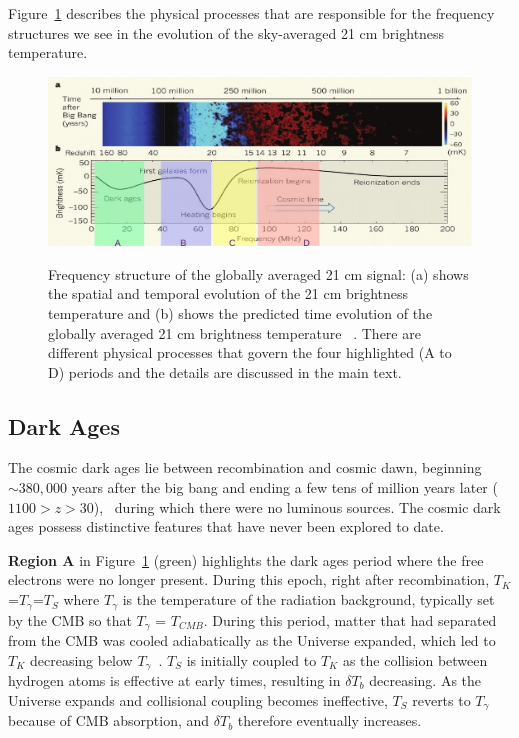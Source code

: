 	Figure~\ref{Fig:epochs} describes the physical processes that are responsible for the frequency structures we see in the evolution of the sky-averaged 21 cm brightness temperature.
	
	\begin{figure}
		\begin{center}
			\includegraphics[width=\linewidth]{Figures/epo.pdf}\\
			\caption{Frequency structure of the globally averaged 21 cm signal: (a) shows the spatial and temporal evolution of the 21 cm brightness temperature and (b) shows the predicted time evolution of the globally averaged 21 cm brightness temperature ~\citep{2012RPPh...75h6901P}. There are different physical processes that govern the four highlighted (A to D) periods and the details are discussed in the main text.}			
			\label{Fig:epochs}
		\end{center}
	\end{figure}
	
	\subsection{Dark Ages}
	
	The cosmic dark ages lie between recombination and cosmic dawn, beginning $\sim380,000$ years after the big bang and ending a few tens of million years later ($1100 > z > 30$),~\citep{2014arXiv1412.2096J} during which there were no luminous sources. The cosmic dark ages possess distinctive features that have never been explored to date. 
	
	\textbf{Region A} in Figure~\ref{Fig:epochs} (green) highlights the dark ages period where the free electrons were no longer present. During this epoch, right after recombination, $T_K$=$T_\gamma$=$T_S$ where $T_\gamma$ is the temperature of the radiation background, typically set by the CMB so that $T_\gamma$ = $T_{CMB}$. During this period, matter that had separated from the CMB was cooled adiabatically as the Universe expanded, which led to $T_K$ decreasing below $T_\gamma$~\citep{2006PhR...433..181F}. $T_S$ is initially coupled to $T_K$ as the collision between hydrogen atoms is effective at early times, resulting in $\delta T_b$ decreasing. As the Universe expands and collisional coupling becomes ineffective, $T_S$ reverts to $T_\gamma$ because of CMB absorption, and $\delta T_b$ therefore eventually increases.
	
